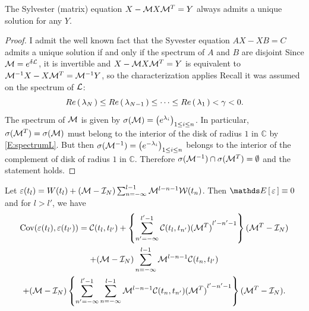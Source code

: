 \documentclass{article}
\newcommand{\B}[1]{{\textcolor{blue}{[Bruno: \textit{#1}]}}}
\renewcommand{\L}[1]{{\textcolor{Brown}{[Ludovic: \textit{#1}]}}}
\begin{document}
\begin{lemma}
The Sylvester (matrix) equation $X-{\mathcal M} X {\mathcal M}^T=Y$ always admits a unique solution for any $Y$.
\end{lemma}
\begin{proof}
I admit the well known fact that the Syvester equation $AX-XB=C$ admits a unique solution if and only if the spectrum of $A$ and $B$ are disjoint %
Since ${\mathcal M}=e^{\delta{\mathcal L}}$, it is invertible and $X-{\mathcal M} X {\mathcal M}^T=Y$ is equivalent to ${\mathcal M}^{-1}X-X {\mathcal M}^T={\mathcal M}^{-1}Y$, so the characterization applies %
Recall it was assumed on the spectrum of ${\mathcal L}$:
\begin{equation}\label{E:spectrumL}
Re\left(\, \lambda_N \, \right) \leq Re\left(\, \lambda_{N-1} \, \right) \leq \dots \leq Re\left(\, \lambda_1 \, \right) < \gamma<0.    
\end{equation}
The spectrum of ${\mathcal M}$ is given by $\sigma({\mathcal M})=\left(e^{\lambda_i}\right)_{1\leq i\leq n}$. In particular, $\sigma({\mathcal M}^T)=\sigma({\mathcal M})$ must belong to the interior of the disk of radius $1$ in $\mathbb{C}$ by \eqref{E:spectrumL}. But then $\sigma({\mathcal M}^{-1})=\left(e^{-\lambda_i}\right)_{1\leq i\leq n}$ belongs to the interior of the complement of disk of radius $1$ in $\mathbb{C}$. Therefore  $\sigma({\mathcal M}^{-1})\cap \sigma({\mathcal M}^T)=\emptyset$ and the statement holds.
\end{proof}



Let $\varepsilon(t_l)=W(t_l)+({\mathcal M}-{\mathcal I}_N)\sum_{n=-\infty}^{l-1}{\mathcal M}^{l-n-1}{\mathcal W}(t_{n})$. Then $\Exp{}\varepsilon\equiv0$ and for $l>l'$, we have 
\begin{multline}
    \mathrm{Cov}(\varepsilon(t_l),\varepsilon(t_{l'}))
    =
    {\mathcal C}(t_l,t_{l'})+
    \left\{
    \sum_{n'=-\infty}^{l'-1}{\mathcal C}(t_l,t_{n'}){({\mathcal M}^T)}^{l'-n'-1}
    \right\}({\mathcal M}^T-{\mathcal I}_N)
    \\
    +
    ({\mathcal M}-{\mathcal I}_N)\sum_{n=-\infty}^{l-1}{{\mathcal M}}^{l-n-1}{\mathcal C}(t_n,t_{l'})
    \\
    +
    ({\mathcal M}-{\mathcal I}_N)
    \left\{
        \sum_{n'=-\infty}^{l'-1}\sum_{n=-\infty}^{l-1}{{\mathcal M}}^{l-n-1}{\mathcal C}(t_n,t_{n'}){({\mathcal M}^T)}^{l'-n'-1}
    \right\}
    ({\mathcal M}^T-{\mathcal I}_N).
\end{multline}
\end{document}
